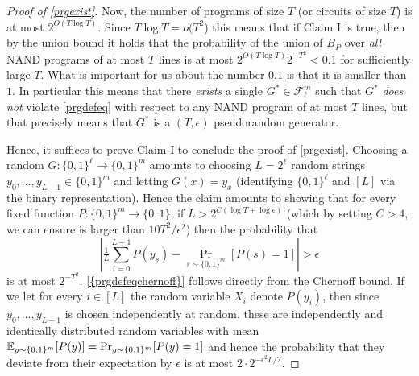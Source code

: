 \begin{proof}[Proof of \cref{prgexist}]
Now, the number of programs of size \(T\) (or circuits of size \(T\)) is
at most \(2^{O(T\log T)}\). Since \(T\log T = o(T^2\)) this means that
if Claim I is true, then by the union bound it holds that the
probability of the union of \(B_P\) over \emph{all} NAND programs of at
most \(T\) lines is at most \(2^{O(T\log T)}2^{-T^2} < 0.1\) for
sufficiently large \(T\). What is important for us about the number
\(0.1\) is that it is smaller than \(1\). In particular this means that
there \emph{exists} a single \(G^* \in \mathcal{F}_\ell^m\) such that
\(G^*\) \emph{does not} violate \eqref{prgdefeq} with respect to any
NAND program of at most \(T\) lines, but that precisely means that
\(G^*\) is a \((T,\epsilon)\) pseudorandom generator.

Hence, it suffices to prove Claim I to conclude the proof of
\cref{prgexist}. Choosing a random
\(G: \{0,1\}^\ell \rightarrow \{0,1\}^m\) amounts to choosing
\(L=2^\ell\) random strings \(y_0,\ldots,y_{L-1} \in \{0,1\}^m\) and
letting \(G(x)=y_x\) (identifying \(\{0,1\}^\ell\) and \([L]\) via the
binary representation). Hence the claim amounts to showing that for
every fixed function \(P:\{0,1\}^m \rightarrow \{0,1\}\), if
\(L > 2^{C (\log T + \log \epsilon)}\) (which by setting \(C>4\), we can
ensure is larger than \(10 T^2/\epsilon^2\)) then the probability that
\[
\left| \tfrac{1}{L}\sum_{i=0}^{L-1} P(y_s) - \Pr_{s \sim \{0,1\}^m}[P(s)=1] \right| > \epsilon \label{prgdefeqchernoff}
\] is at most \(2^{-T^2}\). \eqref{{prgdefeqchernoff}} follows directly
from the Chernoff bound. If we let for every \(i\in [L]\) the random
variable \(X_i\) denote \(P(y_i)\), then since \(y_0,\ldots,y_{L-1}\) is
chosen independently at random, these are independently and identically
distributed random variables with mean
\(\operatorname*{\mathbb E}_{y \sim \{0,1\}^m}[P(y)]= \Pr_{y\sim \{0,1\}^m}[ P(y)=1]\) and
hence the probability that they deviate from their expectation by
\(\epsilon\) is at most \(2\cdot 2^{-\epsilon^2 L/2}\).

\end{proof}
